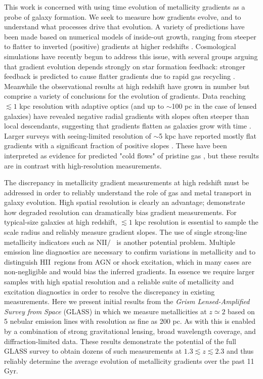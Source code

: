 This work is concerned with using time evolution of metallicity gradients as a probe of galaxy formation. We seek
to measure how gradients evolve, and to understand what processes drive that evolution. A variety of predictions
have been made based on numerical models of inside-out growth, ranging from steeper to flatter to inverted
(positive) gradients at higher redshifts \citep[e.g.,][]{Prantzos2000, Chiappini2001, Magrini2007, Fu2009}.
Cosmological simulations have recently begun to address this issue, with several groups arguing that gradient
evolution depends strongly on star formation feedback: stronger feedback is predicted to cause flatter gradients
due to rapid gas recycling \citep{Pilkington2012, Gibson2013, Angles-Alcazar2014}. Meanwhile the observational
results at high redshift have grown in number but comprise a variety of conclusions for the evolution of
gradients. Data reaching $\lesssim1$ kpc resolution with adaptive optics (and up to $\sim$100 pc in the case of
lensed galaxies) have revealed negative radial gradients with slopes often steeper than local descendants,
suggesting that gradients flatten as galaxies grow with time \citep{Jones2010,Jones2013,Yuan2011,Swinbank2012}.
Larger surveys with seeing-limited resolution of $\sim$5 kpc have reported mostly flat gradients with a
significant fraction of positive slopes \citep{Cresci2010,Queyrel2012,Stott2014,Troncoso2014}. These have been
interpreted as evidence for predicted "cold flows" of pristine gas
\citep[e.g.,][]{Dekel2009,Keres2009,Faucher-Giguere2011}, but these results are in contrast with high-resolution
measurements.

The discrepancy in metallicity gradient measurements at high redshift must be addressed in order to reliably
understand the role of gas and metal transport in galaxy evolution. High spatial resolution is clearly an
advantage; \citet{Yuan2013} demonstrate how degraded resolution can dramatically bias gradient measurements. For
typical-size galaxies at high redshift, $\lesssim1$ kpc resolution is essential to sample the scale radius and
reliably measure gradient slopes. The use of single strong-line metallicity indicators such as NII$/$\Ha\
\citep[e.g.,][]{Pettini2004} is another potential problem. Multiple emission line diagnostics are necessary  to
confirm variations in metallicity \citep[e.g.,][]{Jones2013} and to distinguish HII\ regions from AGN or shock
excitation, which in many cases are non-negligible \citep{Wright2010,Yuan2012,Newman2014} and would bias the
inferred gradients. In essence we require larger samples with high spatial resolution and a reliable suite of
metallicity and excitation diagnostics in order to resolve the discrepancy in existing measurements. Here we
present initial results from the \emph{Grism Lensed-Amplified Survey from Space} (GLASS) in which we measure
metallicities at $z\simeq2$ based on 5 nebular emission lines with resolution as fine as 200 pc. As with
\citet{Jones2013} this is enabled by a combination of strong gravitational lensing, broad wavelength coverage,
and diffraction-limited data. These results demonstrate the potential of the full GLASS survey to obtain dozens
of such measurements at $1.3\lesssim z \lesssim2.3$ and thus reliably determine the average evolution of
metallicity gradients over the past 11 Gyr.

